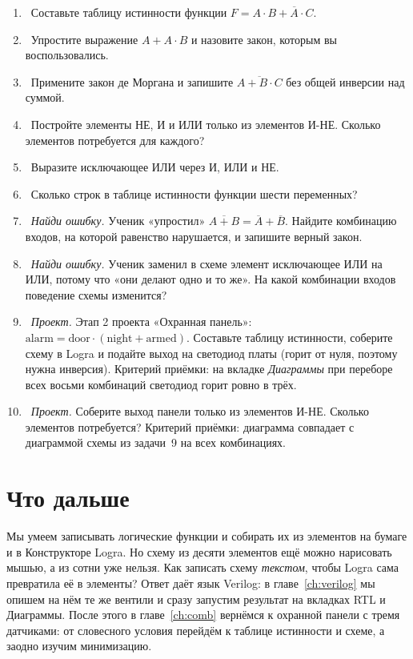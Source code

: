 \begin{taskbox}
\begin{enumerate}
  \item {}~Составьте таблицу истинности функции $F = A\cdot B + \overline{A}\cdot C$.
  \item {}~Упростите выражение $A + A\cdot B$ и назовите закон, которым вы воспользовались.
  \item {}~Примените закон де Моргана и запишите $\overline{A + B\cdot C}$ без общей инверсии над суммой.
  \item {}~Постройте элементы НЕ, И и ИЛИ только из элементов И-НЕ. Сколько элементов потребуется для каждого?
  \item {}~Выразите исключающее ИЛИ через И, ИЛИ и НЕ.
  \item {}~Сколько строк в таблице истинности функции шести переменных?
  \item {}~\emph{Найди ошибку.} Ученик «упростил» $\overline{A+B}=\overline{A}+\overline{B}$. Найдите комбинацию входов, на которой равенство нарушается, и запишите верный закон.
  \item {}~\emph{Найди ошибку.} Ученик заменил в схеме элемент исключающее ИЛИ на ИЛИ, потому что «они делают одно и то же». На какой комбинации входов поведение схемы изменится?
  \item {}~\emph{Проект.} Этап 2 проекта «Охранная панель»: $\text{alarm}=\text{door}\cdot(\text{night}+\text{armed})$. Составьте таблицу истинности, соберите схему в Logra и подайте выход на светодиод платы (горит от нуля, поэтому нужна инверсия). Критерий приёмки: на вкладке \emph{Диаграммы} при переборе всех восьми комбинаций светодиод горит ровно в трёх.
  \item {}~\emph{Проект.} Соберите выход  панели только из элементов И-НЕ. Сколько элементов потребуется? Критерий приёмки: диаграмма совпадает с диаграммой схемы из задачи~9 на всех комбинациях.
\end{enumerate}
\end{taskbox}

\section{Что дальше}

Мы умеем записывать логические функции и собирать их из элементов на
бумаге и в Конструкторе Logra. Но схему из десяти элементов ещё можно нарисовать
мышью, а из сотни уже нельзя. Как записать схему \emph{текстом}, чтобы Logra
сама превратила её в элементы? Ответ даёт язык Verilog: в
главе~\ref{ch:verilog} мы опишем на нём те же вентили и сразу запустим результат
на вкладках RTL и Диаграммы. После этого в главе~\ref{ch:comb} вернёмся к
охранной панели с тремя датчиками: от словесного условия перейдём к таблице
истинности и схеме, а заодно изучим минимизацию.
